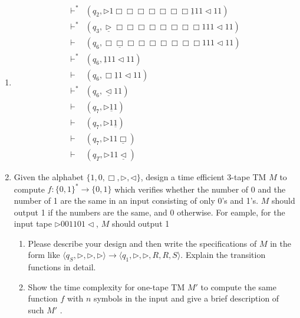 \documentclass[12pt,a4paper]{article}
\makeatletter
\newtheorem*{solution}{Solution}
\theoremstyle{definition}
\renewenvironment{solution}[1][Solution] {\par\pushQED{\qed}\normalfont\topsep6\p@\@plus6\p@\relax\trivlist\item[\hskip\labelsep\bfseries#1\@addpunct{.}]\ignorespaces}{\popQED\endtrivlist\@endpefalse} \makeatother
\makeatother
\begin{document}
\begin{enumerate}
\begin{solution}
\begin{enumerate}
\begin{align*}
				\vdash^* &(q_2,\triangleright  1  \Box \Box  \Box \Box \Box  \Box \Box   \underline{1} 1 1 \triangleleft 1 1)\\
				\vdash^* &(q_3,\underline{\triangleright}  \Box \Box \Box  \Box \Box \Box  \Box \Box 1 1 1 \triangleleft 1 1)\\
				\vdash &(q_6, \Box \underline{\Box} \Box \Box  \Box \Box \Box  \Box \Box 1 1 1 \triangleleft 1 1)\\
				\vdash^* &(q_6, \underline{1} 1 1 \triangleleft 1 1)\\
				\vdash &(q_6, \Box \underline{1} 1 \triangleleft 1 1)\\
				\vdash^* &(q_6, \underline{\triangleleft} 1 1)\\
				\vdash &(q_7, \triangleright \underline{1} 1)\\
				\vdash &(q_7, \triangleright 1 \underline{1})\\
				\vdash &(q_7, \triangleright 1 1 \underline{\Box})\\
				\vdash &(q_T, \triangleright 1 1 \underline{\triangleleft})
			\end{align*}

			
		\end{enumerate}
	\end{solution}


    \item 
    Given the alphabet $\{1, 0, \Box, \triangleright, \triangleleft\}$, design a time efficient 3-tape TM $M$ to compute $f:\{0,1\}^*\rightarrow\{0,1\}$ which verifies whether the number of 0 and the number of 1 are the same in an input consisting of only 0's and 1's. $M$ should output 1 if the numbers are the same, and 0 otherwise. For eample, for the input tape $\triangleright 001101\triangleleft$, $M$ should output 1
    
    \begin{enumerate}
	    \item
	    Please describe your design and then write the specifications of $M$ in the form like $\langle q_S, \triangleright, \triangleright, \triangleright \rangle \rightarrow \langle q_1, \triangleright,\triangleright,  R, R, S \rangle$. Explain the transition functions in detail.
	    
	    \item 
	    Show the time complexity for one-tape TM $M'$ to compute the same function $f$ with $n$ symbols in the input and give a brief description of such $M'$ .
	
	\end{enumerate}
	

\end{enumerate}
\end{document}
